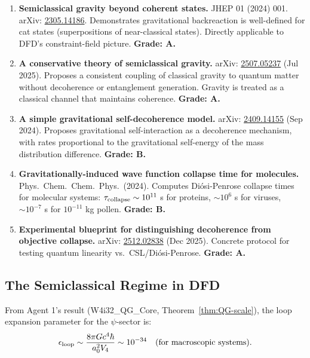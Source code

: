 \documentclass[11pt,a4paper]{article}
\begin{document}
\begin{enumerate}
\item \textbf{Semiclassical gravity beyond coherent states.} JHEP 01 (2024) 001. arXiv: \href{https://arxiv.org/abs/2305.14186}{2305.14186}. Demonstrates gravitational backreaction is well-defined for cat states (superpositions of near-classical states). Directly applicable to DFD's constraint-field picture. \textbf{Grade: A.}

\item \textbf{A conservative theory of semiclassical gravity.} arXiv: \href{https://arxiv.org/abs/2507.05237}{2507.05237} (Jul 2025). Proposes a consistent coupling of classical gravity to quantum matter without decoherence or entanglement generation. Gravity is treated as a classical channel that maintains coherence. \textbf{Grade: A.}

\item \textbf{A simple gravitational self-decoherence model.} arXiv: \href{https://arxiv.org/abs/2409.14155}{2409.14155} (Sep 2024). Proposes gravitational self-interaction as a decoherence mechanism, with rates proportional to the gravitational self-energy of the mass distribution difference. \textbf{Grade: B.}

\item \textbf{Gravitationally-induced wave function collapse time for molecules.} Phys.\ Chem.\ Chem.\ Phys.\ (2024). Computes Di\'{o}si-Penrose collapse times for molecular systems: $\tau_{\rm collapse} \sim 10^{11}$ s for proteins, $\sim 10^6$ s for viruses, $\sim 10^{-7}$ s for $10^{-11}$ kg pollen. \textbf{Grade: B.}

\item \textbf{Experimental blueprint for distinguishing decoherence from objective collapse.} arXiv: \href{https://arxiv.org/abs/2512.02838}{2512.02838} (Dec 2025). Concrete protocol for testing quantum linearity vs.\ CSL/Di\'{o}si-Penrose. \textbf{Grade: A.}
\end{enumerate}

\subsection{The Semiclassical Regime in DFD}
\label{sec:semiclassical-regime}

From Agent 1's result (W4i32\_QG\_Core, Theorem~\ref{thm:QG-scale}), the loop expansion parameter for the $\psi$-sector is:
\begin{equation}
\epsilon_{\rm loop} \sim \frac{8\pi G c^4 \hbar}{a_0^2 V_4} \sim 10^{-34}\quad\text{(for macroscopic systems)}.
\end{equation}
\end{document}
